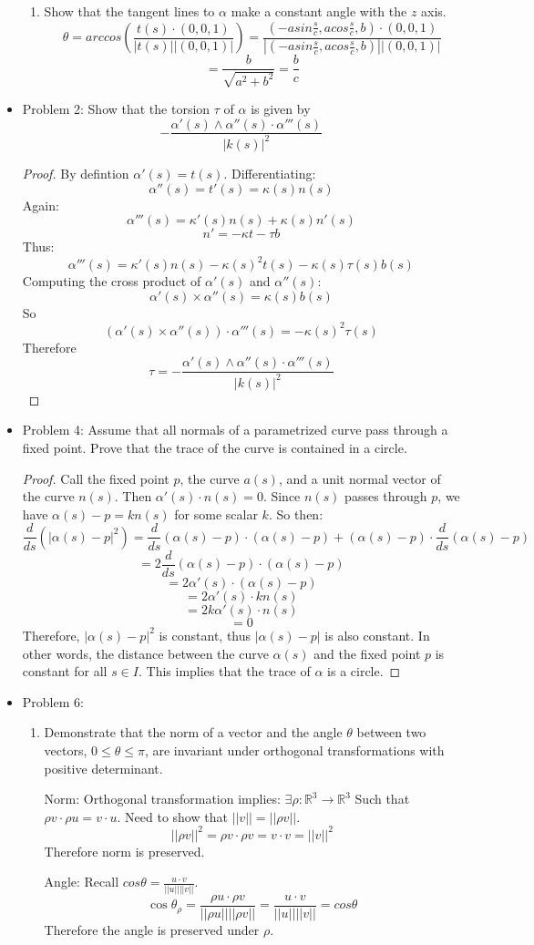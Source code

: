 \documentclass[a4paper,17pt]{extarticle}
\theoremstyle{definition}
\renewcommand{\skip}{\par\null\par}
\newcommand{\R}{\mathbb{R}}
\begin{document}
\begin{itemize}
\begin{enumerate}[label={\alph*.}]
        \item Show that the tangent lines to $\alpha$ make a constant angle with the $z$ axis. $$\theta=arccos\left(\frac{t(s)\cdot (0,0,1)}{|t(s)||(0,0,1)|}\right)=\frac{(-asin\frac{s}{c},acos\frac{s}{c},b)\cdot(0,0,1)}{|(-asin\frac{s}{c},acos\frac{s}{c},b)||(0,0,1)|}$$ $$=\frac{b}{\sqrt{a^2+b^2}}=\frac{b}{c}$$
    \end{enumerate}
    \item Problem 2: Show that the torsion $\tau$ of $\alpha$ is given by $$-\frac{\alpha'(s)\wedge \alpha''(s)\cdot\alpha'''(s)}{|k(s)|^2}$$ \begin{proof} By defintion $\alpha'(s)=t(s)$. Differentiating: $$\alpha''(s)=t'(s)=\kappa(s)n(s)$$ Again: $$\alpha'''(s)=\kappa'(s)n(s)+\kappa(s)n'(s)$$ $$n'=-\kappa t-\tau b$$ Thus: $$\alpha'''(s)=\kappa'(s)n(s)-\kappa(s)^2t(s)-\kappa(s)\tau(s)b(s)$$ Computing the cross product of $\alpha'(s)$ and $\alpha''(s)$: $$\alpha'(s)\times\alpha''(s)=\kappa(s)b(s)$$ So $$(\alpha'(s)\times\alpha''(s))\cdot\alpha'''(s)=-\kappa(s)^2\tau(s)$$ Therefore $$\tau=-\frac{\alpha'(s)\wedge \alpha''(s)\cdot\alpha'''(s)}{|k(s)|^2}$$
    \end{proof}
    \item Problem 4: Assume that all normals of a parametrized curve pass through a fixed point. Prove that the trace of the curve is contained in a circle.\begin{proof}Call the fixed point $p$, the curve $a(s)$, and a unit normal vector of the curve $n(s)$. Then $\alpha'(s)\cdot n(s)=0$. Since $n(s)$ passes through $p$, we have $\alpha(s)-p=kn(s)$ for some scalar $k$. So then: 
    $$\frac{d}{ds}(|\alpha(s)-p|^2)=\frac{d}{ds}(\alpha(s)-p)\cdot(\alpha(s)-p)+(\alpha(s)-p)\cdot\frac{d}{ds}(\alpha(s)-p)$$ $$=2\frac{d}{ds}(\alpha(s)-p)\cdot(\alpha(s)-p)$$ $$=2\alpha'(s)\cdot(\alpha(s)-p)$$ $$=2\alpha'(s)\cdot kn(s)$$ $$=2k\alpha'(s)\cdot n(s)$$ $$=0$$ Therefore, $|\alpha(s)-p|^2$ is constant, thus $|\alpha(s)-p|$ is also constant. In other words, the distance between the curve $\alpha(s)$ and the fixed point $p$ is constant for all $s\in I$. This implies that the trace of $\alpha$ is a circle.
    \end{proof}
    \item Problem 6: \begin{enumerate}[label=\alph*.]
        \item Demonstrate that the norm of a vector and the angle $\theta$ between two vectors, $0\leq\theta\leq\pi$, are invariant under orthogonal transformations with positive determinant.\skip Norm: Orthogonal transformation implies: $\exists\rho:\R^3\to\R^3$ Such that $\rho v\cdot\rho u=v\cdot u$. Need to show that $||v||=||\rho v||$. $$||\rho v||^2=\rho v\cdot\rho v=v\cdot v=||v||^2$$ Therefore norm is preserved.\skip Angle: Recall $cos\theta=\frac{u\cdot v}{||u||||v||}$. $$\cos\theta_{\rho}=\frac{\rho u\cdot \rho v}{||\rho u||||\rho v||}=\frac{u\cdot v}{||u||||v||}=cos\theta$$Therefore the angle is preserved under $\rho$.

\end{enumerate}
\end{itemize}
\end{document}
